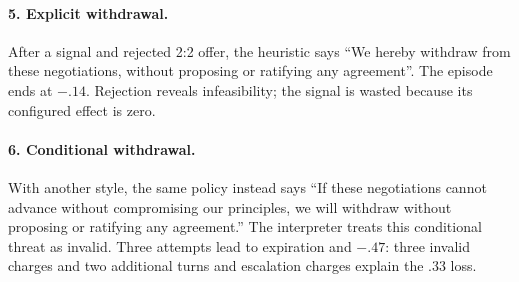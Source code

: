 \paragraph{5. Explicit withdrawal.}
After a signal and rejected 2:2 offer, the heuristic says ``We hereby withdraw from these negotiations, without proposing or ratifying any agreement''. The episode ends at $-.14$. Rejection reveals infeasibility; the signal is wasted because its configured effect is zero.

\paragraph{6. Conditional withdrawal.}
With another style, the same policy instead says ``If these negotiations cannot advance without compromising our principles, we will withdraw without proposing or ratifying any agreement.'' The interpreter treats this conditional threat as invalid. Three attempts lead to expiration and $-.47$: three invalid charges and two additional turns and escalation charges explain the .33 loss.
